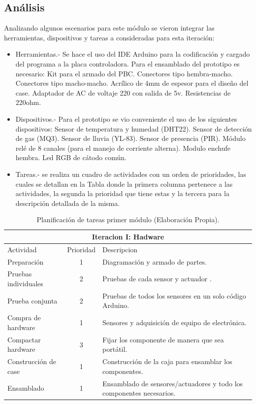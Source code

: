 \documentclass[11pt,letterpaper]{report}
\begin{document}
	\subsection{Análisis}
	Analizando algunos escenarios para este módulo se vieron integrar las herramientas, dispositivos y tareas a consideradas para esta iteración:
	\begin{itemize}
	\item Herramientas.-  Se hace el uso del  IDE Arduino para la codificación y cargado del programa a la placa controladora. Para el ensamblado del prototipo es necesario: 
	\subitem Kit para el armado del PBC.
 	\subitem Conectores tipo hembra-macho.
	\subitem Conectores tipo macho-macho.
	\subitem Acrílico de 4mm de espesor para el diseño del case.
	\subitem Adaptador de AC de voltaje 220 con salida de 5v.
	\subitem Resistencias de 220ohm.
	\item Dispositivos.- Para el prototipo se vio conveniente el uso de los siguientes dispositivos: 
	\subitem Sensor de temperatura y humedad (DHT22).
	\subitem Sensor de detección de gas (MQ3). 
	\subitem Sensor de lluvia (YL-83). 
	\subitem Sensor de presencia (PIR).
	\subitem Módulo relé de 8 canales (para el manejo de corriente alterna).
	\subitem Modulo enchufe hembra.
	\subitem Led RGB de cátodo común.
	\item Tareas.- se realiza un cuadro de actividades con un orden de prioridades, las cuales se detallan en la Tabla  donde la primera columna pertenece a las actividades, la segunda la prioridad que tiene  estas y la tercera para la descripción detallada de la misma.
	
	\end{itemize}
	\begin{table}[ht]
			\begin{center} %
				\begin{tabular} {||l | c | p{8cm}||}
					\hline 
					\hline
					\multicolumn{3}{|c|}{Iteracion I: Hadware}\\
					\hline
					\hline 
					 Actividad & Prioridad & Descripcion \\   
					\hline
					\hline
					Preparación & 1 & Diagramación y armado de partes. \\  
					\hline
					Pruebas individuales & 2 &Pruebas de cada sensor y actuador . \\
					\hline
					Prueba conjunta & 2 & Pruebas de todos los sensores en un solo código Arduino. \\
					\hline
					Compra de hardware & 1 & Sensores y adquisición de equipo de electrónica.\\
					\hline
					Compactar hardware	& 3 & Fijar los componente de manera que sea portátil.\\
					\hline
					Construcción de case & 1 & Construcción de la caja para ensamblar los componentes.\\
					\hline
					Ensamblado & 1 & Ensamblado de sensores/actuadores  y todo los componentes necesarios.\\
					\hline
				\end{tabular}			
			\caption{Planificación de tareas primer módulo (Elaboración Propia).} 
			\label{tarea1}
			\end{center}
		\end{table}
\end{document}
